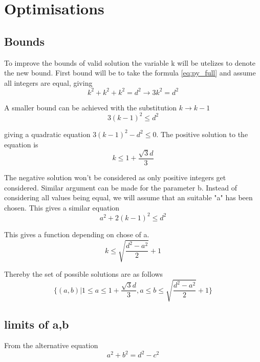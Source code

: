\documentclass{article}
\begin{document}
\section{Optimisations}\label{sec:teory}

\subsection{Bounds}

To improve the bounds of valid solution the variable k will be utelizes to denote the new bound. First bound will be to take the formula \ref{eq:py_full} and assume all integers are equal, giving
$$
	k^2 + k^2 + k^2 = d^2 \to 3k^2 = d^2
$$

A smaller bound can be achieved with the substitution $k \to k-1$
$$
	3(k-1)^2 \le d^2
$$

giving a quadratic equation $3(k-1)^2 - d^2 \le 0$. The positive solution to the equation is 
$$
	k \le 1+\frac{\sqrt{3}d}{3}
$$

The negative solution won't be considered as only positive integers get considered. Similar argument can be made for the parameter b. Instead of considering all values being equal, we will assume that an suitable "a" has been chosen. This gives a similar equation
$$
	a^2 + 2(k-1)^2 \le d^2
$$

This gives a function depending on chose of a.
$$
	k \le \sqrt{\frac{d^2-a^2}{2}}+1
$$

Thereby the set of possible solutions are as follows
$$
\{(a,b) | 1\le a \le 1+\frac{\sqrt{3}d}{3}, a \le b \le \sqrt{\frac{d^2-a^2}{2}}+1\}
$$

\subsection{limits of a,b}

From the alternative equation
$$
	a^2+b^2=d^2-c^2
$$
\end{document}
